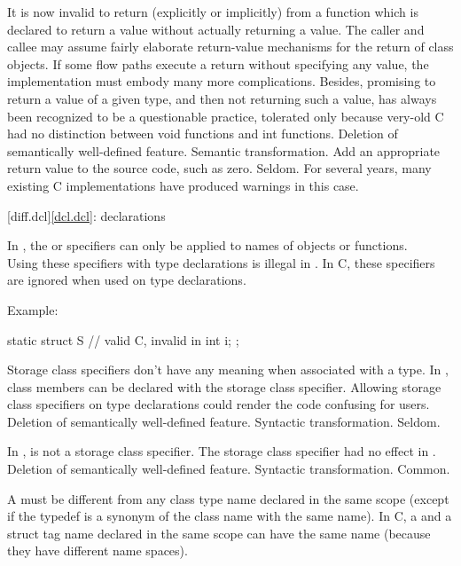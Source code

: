 \change
It is now invalid to return (explicitly or implicitly) from a function which is
declared to return a value without actually returning a value.
\rationale
The caller and callee may assume fairly elaborate
return-value mechanisms for the return of class objects.
If
some flow paths execute a return without specifying any value,
the implementation must embody many more complications.
Besides,
promising to return a value of a given type, and then not returning
such a value, has always been recognized to be a questionable
practice, tolerated only because very-old C had no distinction between
void  functions and  int  functions.
\effect
Deletion of semantically well-defined feature.
\difficulty
Semantic transformation.
Add an appropriate return value to the source code, such as zero.
\howwide
Seldom.
For several years, many existing C implementations have produced warnings in
this case.

[diff.dcl]{\ref{dcl.dcl}: declarations}

\change
In \Cpp{}, the  or  specifiers can only be applied to names of objects or functions.\\
Using these specifiers with type declarations is illegal in \Cpp{}.
In C, these specifiers are ignored when used on type declarations.

Example:
\begin{codeblock}
static struct S {               // valid C, invalid in \Cpp{}
  int i;
};
\end{codeblock}

\rationale
Storage class specifiers don't have any meaning when associated
with a type.
In \Cpp{}, class members can be declared with the  storage
class specifier.
Allowing storage class specifiers on type
declarations could render the code confusing for users.
\effect
Deletion of semantically well-defined feature.
\difficulty
Syntactic transformation.
\howwide
Seldom.

\change
In \Cpp{},  is not a storage class specifier.
\rationale
The storage class specifier had no effect in \Cpp{}.
\effect
Deletion of semantically well-defined feature.
\difficulty
Syntactic transformation.
\howwide
Common.

\change
A \Cpp{}  must be different from any class type name declared
in the same scope (except if the typedef is a synonym of the class name with the
same name). In C, a  and a struct tag name declared in the same scope
can have the same name (because they have different name spaces).

